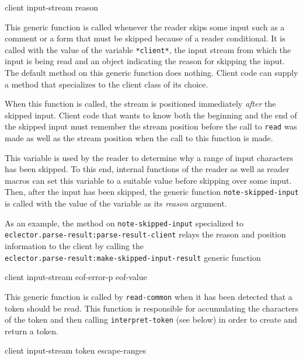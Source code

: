  {client input-stream reason}

This generic function is called whenever the reader skips some input
such as a comment or a form that must be skipped because of a reader
conditional.  It is called with the value of the variable
\texttt{*client*}, the input stream from which the input is being read
and an object indicating the reason for skipping the input.  The
default method on this generic function does nothing.  Client code can
supply a method that specializes to the client class of its choice.

When this function is called, the stream is positioned immediately
\emph{after} the skipped input.  Client code that wants to know both
the beginning and the end of the skipped input must remember the
stream position before the call to \texttt{read} was made as well as
the stream position when the call to this function is made.


This variable is used by the reader to determine why a range of input
characters has been skipped.  To this end, internal functions of the
reader as well as reader macros can set this variable to a suitable
value before skipping over some input.  Then, after the input has been
skipped, the generic function \texttt{note-skipped-input} is called
with the value of the variable as its \textit{reason} argument.

As an example, the method on \texttt{note-skipped-input} specialized
to\\
\texttt{eclector.parse-result:parse-result-client} relays the reason
and position information to the client by calling the\\
\texttt{eclector.parse-result:make-skipped-input-result} generic
function~

 {client input-stream eof-error-p eof-value}

This generic function is called by \texttt{read-common} when it has
been detected that a token should be read.  This function is
responsible for accumulating the characters of the token and then
calling \texttt{interpret-token} (see below) in order to create and
return a token.

 {client input-stream token escape-ranges}

